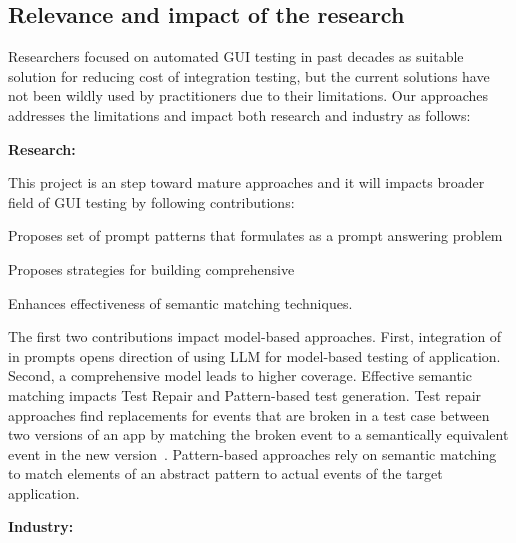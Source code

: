 \subsection{Relevance and impact of the research }


Researchers focused on automated GUI testing in past decades as  suitable solution for reducing cost of integration testing, but the current solutions have not been wildly used by practitioners due to their limitations. 
Our approaches addresses the limitations and impact both research and industry as follows:




\smallskip
\noindent
\textbf{Research:}

\noindent
This project is an step toward mature  \testreuse approaches and it will impacts broader field of  GUI testing by following contributions:
\begin{inparaenum}[(i)]
\item Proposes set of prompt patterns that formulates \testreuse as a prompt answering problem
\item Proposes strategies for building comprehensive \tam
\item Enhances effectiveness of semantic matching techniques.
\end{inparaenum}
The first two contributions impact model-based approaches.
First, integration of \tam in prompts opens direction of using LLM for model-based testing of application.
Second, a comprehensive model leads to higher coverage.
Effective semantic matching impacts Test Repair and Pattern-based test generation.
Test repair approaches find replacements for events that are broken in a test case between two versions of an app by matching the broken event to a semantically equivalent event in the new version~\cite{Choudhary:Water:ETSE:2011,Stocco:VisualRepair:FSE:2018,Pan:Meter:TSE:2022}.
Pattern-based approaches rely on semantic matching to match elements of an abstract pattern to actual events of the target application.


\smallskip
\noindent
\textbf{Industry:}

